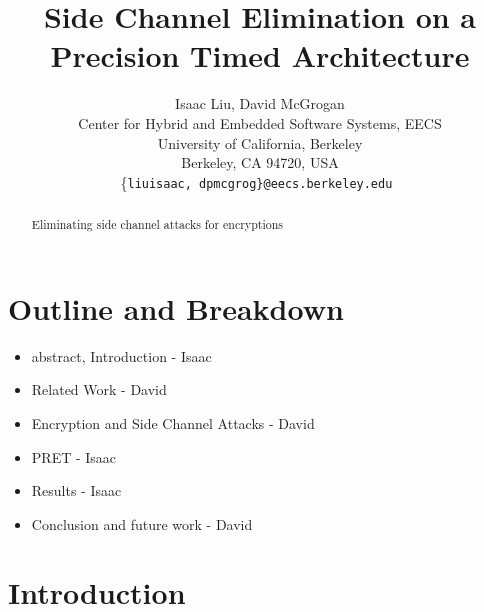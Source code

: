 \documentclass[times, 10pt,twocolumn]{article}
\begin{document}
  \title{Side Channel Elimination on a Precision Timed Architecture}

  \author{Isaac Liu, David McGrogan \\
    Center for Hybrid and Embedded Software Systems, EECS \\
    University of California, Berkeley \\
    Berkeley, CA 94720, USA \\
    \{\tt liuisaac, dpmcgrog\}@eecs.berkeley.edu
  }


\maketitle
\thispagestyle{empty}

\begin{abstract}
Eliminating side channel attacks for encryptions
\end{abstract}


\section{Outline and Breakdown}
\begin{itemize}
\item abstract, Introduction  - Isaac
\item Related Work - David
\item Encryption and Side Channel Attacks - David
\item PRET  - Isaac 
\item Results  - Isaac
\item Conclusion and future work - David
\end{itemize}

\section{Introduction}
\end{document}
